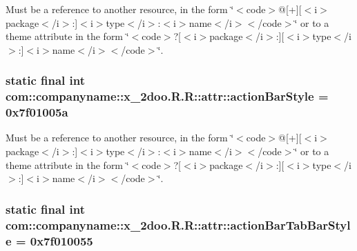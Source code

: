 Must be a reference to another resource, in the form \char`\"{}$<$code$>$@\mbox{[}+\mbox{]}\mbox{[}$<$i$>$package$<$/i$>$:\mbox{]}$<$i$>$type$<$/i$>$:$<$i$>$name$<$/i$>$$<$/code$>$\char`\"{} or to a theme attribute in the form \char`\"{}$<$code$>$?\mbox{[}$<$i$>$package$<$/i$>$:\mbox{]}\mbox{[}$<$i$>$type$<$/i$>$:\mbox{]}$<$i$>$name$<$/i$>$$<$/code$>$\char`\"{}. \hypertarget{classcom_1_1companyname_1_1x__2doo_1_1_r_1_1attr_fac08ea086d0d3d0e2249245e5fc058f}{
\subsubsection[{actionBarStyle}]{\setlength{\rightskip}{0pt plus 5cm}static final int com::companyname::x\_\-2doo.R.R::attr::actionBarStyle = 0x7f01005a}}
\label{classcom_1_1companyname_1_1x__2doo_1_1_r_1_1attr_fac08ea086d0d3d0e2249245e5fc058f}


Must be a reference to another resource, in the form \char`\"{}$<$code$>$@\mbox{[}+\mbox{]}\mbox{[}$<$i$>$package$<$/i$>$:\mbox{]}$<$i$>$type$<$/i$>$:$<$i$>$name$<$/i$>$$<$/code$>$\char`\"{} or to a theme attribute in the form \char`\"{}$<$code$>$?\mbox{[}$<$i$>$package$<$/i$>$:\mbox{]}\mbox{[}$<$i$>$type$<$/i$>$:\mbox{]}$<$i$>$name$<$/i$>$$<$/code$>$\char`\"{}. \hypertarget{classcom_1_1companyname_1_1x__2doo_1_1_r_1_1attr_c00dbca68f5e15ddc304e06a18c43a7d}{
\subsubsection[{actionBarTabBarStyle}]{\setlength{\rightskip}{0pt plus 5cm}static final int com::companyname::x\_\-2doo.R.R::attr::actionBarTabBarStyle = 0x7f010055}}
\label{classcom_1_1companyname_1_1x__2doo_1_1_r_1_1attr_c00dbca68f5e15ddc304e06a18c43a7d}


